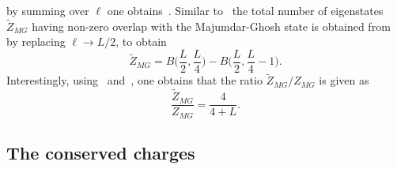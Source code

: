 \documentclass[11pt]{iopart}
\begin{document}
%
by summing over $\ell$ one obtains~. Similar to~ the 
total number of eigenstates $\widetilde Z_{MG}$ having non-zero overlap with the 
Majumdar-Ghosh state is obtained from~ by replacing $\ell\to L/2$, to obtain 
%
\begin{equation}
\label{mg-fi}
\widetilde Z_{MG}=B\Big(\frac{L}{2},\frac{L}{4}\Big)-B\Big(\frac{L}{2},\frac{L}{4}-1
\Big). 
\end{equation}
%
Interestingly, using~ and~, one obtains that the ratio 
$\widetilde Z_{MG}/Z_{MG}$ is given as 
%
\begin{equation}
\frac{\widetilde Z_{MG}}{Z_{MG}}=\frac{4}{4+L}. 
\end{equation}
%




\subsection{The conserved charges}
\label{sec:1.5}
\end{document}
